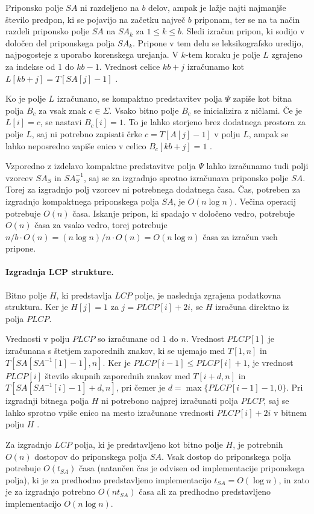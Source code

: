 Priponsko polje $SA$ ni razdeljeno na $b$ delov, ampak je lažje najti najmanjše število predpon, ki se pojavijo na začetku največ $b$ priponam, ter se na ta način razdeli priponsko polje $SA$ na $SA_k$ za $1\le k\le b$. Sledi izračun pripon, ki sodijo v določen del priponskega polja $SA_k$. Pripone v tem delu se leksikografsko uredijo, najpogosteje z uporabo korenskega urejanja. V $k$-tem koraku je polje $L$ zgrajeno za indekse od 1 do $kb-1$. Vrednost celice $kb+j$ izračunamo kot $L[kb+j]=T[SA[j]-1]$ \cite{Navarro2016}.

Ko je polje $L$ izračunano, se kompaktno predstavitev polja $\Psi$ zapiše kot bitna polja $B_c$ za vsak znak $c\in \Sigma$. Vsako bitno polje $B_c$ se inicializira z ničlami. Če je $L[i]=c$, se nastavi $B_c[i]=1$. To je lahko storjeno brez dodatnega prostora za polje $L$, saj ni potrebno zapisati črke $c=T[A[j]-1]$ v polju $L$, ampak se lahko neposredno zapiše enico v celico $B_c[kb+j]=1$ \cite{Navarro2016}.

Vzporedno z izdelavo kompaktne predstavitve polja $\Psi$ lahko izračunamo  tudi polji vzorcev $SA_S$ in $SA_S^{-1}$, saj se za izgradnjo sprotno izračunava priponsko polje $SA$. Torej za izgradnjo polj vzorcev ni potrebnega dodatnega časa. Čas, potreben za izgradnjo kompaktnega priponskega polja $SA$, je $O(n\log{n})$. Večina operacij potrebuje $O(n)$ časa. Iskanje pripon, ki spadajo v določeno vedro, potrebuje $O(n)$ časa za vsako vedro, torej potrebuje $n/b\cdot O(n)=(n\log{n})/n\cdot O(n)=O(n\log{n})$ časa za izračun vseh pripone. 

\paragraph{Izgradnja LCP strukture.}
Bitno polje $H$, ki predstavlja $LCP$ polje, je naslednja zgrajena podatkovna struktura. Ker je $H[j]=1$ za $j=PLCP[i]+2i$, se $H$ izračuna direktno iz polja $PLCP$.

Vrednosti v polju $PLCP$ so izračunane od $1$ do $n$. Vrednost $PLCP[1]$ je izračunana s štetjem zaporednih znakov, ki se ujemajo med $T[1,n]$ in $T[SA[SA^{-1}[1]-1],n]$. Ker je $PLCP[i-1]\le PLCP[i]+1$, je vrednost $PLCP[i]$ število skupnih zaporednih znakov med $T[i+d,n]$ in $T[SA[SA^{-1}[i]-1]+d,n]$, pri čemer je $d=\max\{PLCP[i-1]-1,0\}$.
Pri izgradnji bitnega polja $H$ ni potrebono najprej izračunati polja $PLCP$, saj se lahko sprotno vpiše enico na mesto izračunane vrednosti $PLCP[i]+2i$ v bitnem polju $H$ \cite{Navarro2016}.

Za izgradnjo $LCP$ polja, ki je predstavljeno kot bitno polje $H$, je potrebnih $O(n)$ dostopov do priponskega polja $SA$. Vsak dostop do priponskega polja potrebuje $O(t_{SA})$ časa (natančen čas je odvisen od implementacije priponskega polja), ki je za predhodno predstavljeno implementacijo $t_{SA}= O(\log{n})$, in zato je za izgradnjo potrebno $O(nt_{SA})$ časa ali za predhodno predstavljeno implementacijo $O(n\log{n})$.

